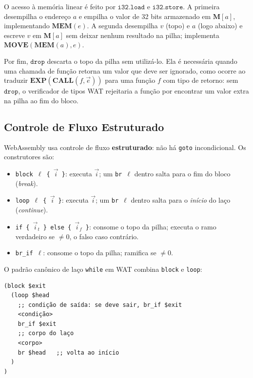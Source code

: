 O acesso à memória linear é feito por $\mathtt{i32.load}$ e
$\mathtt{i32.store}$. A primeira desempilha o endereço $a$ e empilha o valor
de 32 bits armazenado em $\mathbf{M}[a]$, implementando $\mathbf{MEM}(e)$.
A segunda desempilha $v$ (topo) e $a$ (logo abaixo) e escreve $v$ em
$\mathbf{M}[a]$ sem deixar nenhum resultado na pilha; implementa
$\mathbf{MOVE}(\mathbf{MEM}(a), e)$.

Por fim, $\mathtt{drop}$ descarta o topo da pilha sem utilizá-lo. Ela é
necessária quando uma chamada de função retorna um valor que deve ser
ignorado, como ocorre ao traduzir $\mathbf{EXP}(\mathbf{CALL}(f, \vec{e}))$
para uma função $f$ com tipo de retorno: sem $\mathtt{drop}$, o verificador
de tipos WAT rejeitaria a função por encontrar um valor extra na pilha ao
fim do bloco.

\subsection{Controle de Fluxo Estruturado}

WebAssembly usa controle de fluxo \textbf{estruturado}: não há \texttt{goto}
incondicional.  Os construtores são:

\begin{itemize}
  \item \texttt{block $\ell$ \{ $\vec{i}$ \}}: executa $\vec{i}$; um
    \texttt{br $\ell$} dentro salta para o fim do bloco (\emph{break}).
  \item \texttt{loop $\ell$ \{ $\vec{i}$ \}}: executa $\vec{i}$; um
    \texttt{br $\ell$} dentro salta para o \emph{início} do laço
    (\emph{continue}).
  \item \texttt{if \{ $\vec{i}_t$ \} else \{ $\vec{i}_f$ \}}: consome o topo
    da pilha; executa o ramo verdadeiro se $\neq 0$, o falso caso contrário.
  \item \texttt{br\_if $\ell$}: consome o topo da pilha; ramifica se $\neq 0$.
\end{itemize}

O padrão canônico de laço \texttt{while} em WAT combina \texttt{block} e
\texttt{loop}:

\begin{verbatim}
(block $exit
  (loop $head
    ;; condição de saída: se deve sair, br_if $exit
    <condição>
    br_if $exit
    ;; corpo do laço
    <corpo>
    br $head   ;; volta ao início
  )
)
\end{verbatim}

